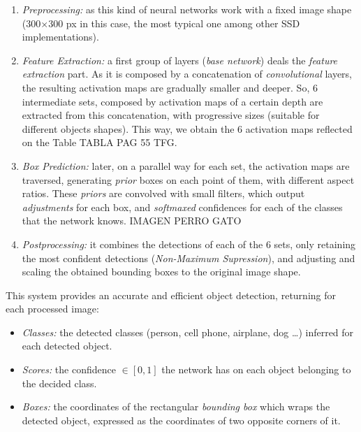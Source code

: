 \begin{enumerate}
	\item \emph{Preprocessing:} as this kind of neural networks work with a fixed image shape (300$\times$300 px in this case, the most typical one among other SSD implementations).\\
	
	\item \emph{Feature Extraction:} a first group of layers (\emph{base network}) deals the \emph{feature extraction} part. As it is composed by a concatenation of \emph{convolutional} layers, the resulting activation maps are gradually smaller and deeper. So, 6 intermediate sets, composed by activation maps of a certain depth are extracted from this concatenation, with progressive sizes (suitable for different objects shapes). This way, we obtain the 6 activation maps reflected on the Table TABLA PAG 55 TFG.
	
	\item \emph{Box Prediction:} later, on a parallel way for each set, the activation maps are traversed, generating \emph{prior} boxes on each point of them, with different aspect ratios. These \emph{priors} are convolved with small filters, which output \emph{adjustments} for each box, and \emph{softmaxed} confidences for each of the classes that the network knows. IMAGEN PERRO GATO
	
	\item \emph{Postprocessing:} it combines the detections of each of the 6 sets, only retaining the most confident detections (\emph{Non-Maximum Supression}), and adjusting and scaling the obtained bounding boxes to the original image shape. 
\end{enumerate}

This system provides an accurate and efficient object detection, returning for each processed image:

\begin{itemize}
	\item \emph{Classes:} the detected classes (person, cell phone, airplane, dog \dots) inferred for each detected object.
	
	\item \emph{Scores:} the confidence $\in [0,1]$ the network has on each object belonging to the decided class.
	
	\item \emph{Boxes:} the coordinates of the rectangular \emph{bounding box} which wraps the detected object, expressed as the coordinates of two opposite corners of it.
\end{itemize}

